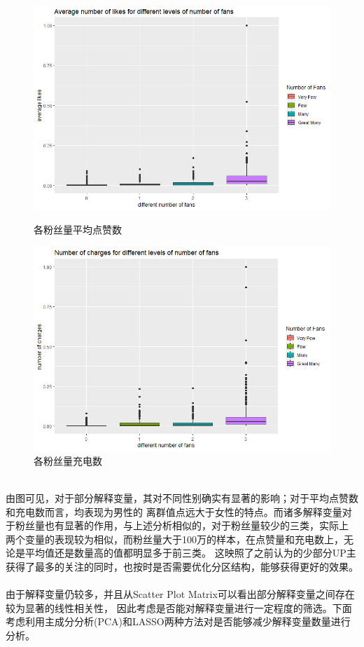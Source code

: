 \documentclass{ctexart}
\begin{document}
\begin{figure}[htbp]
    \centering
    \begin{minipage}[t]{0.48\textwidth}
        \centering
        \includegraphics[width=\textwidth]{EDA/av_like_fans_boxplot.png}
        \caption{各粉丝量平均点赞数}
    \end{minipage}
    \begin{minipage}[t]{0.48\textwidth}
        \centering
        \includegraphics[width=\textwidth]{EDA/num_charge_fan_boxplot.png}
        \caption{各粉丝量充电数}
    \end{minipage}
\end{figure}\\
\indent 由图可见，对于部分解释变量，其对不同性别确实有显著的影响；对于平均点赞数和充电数而言，均表现为男性的
离群值点远大于女性的特点。而诸多解释变量对于粉丝量也有显著的作用，与上述分析相似的，对于粉丝量较少的三类，实际上
两个变量的表现较为相似，而粉丝量大于100万的样本，在点赞量和充电数上，无论是平均值还是数量高的值都明显多于前三类。
这映照了之前认为的少部分UP主获得了最多的关注的同时，也按时是否需要优化分区结构，能够获得更好的效果。\\
\\
\indent 由于解释变量仍较多，并且从Scatter Plot Matrix可以看出部分解释变量之间存在较为显著的线性相关性，
因此考虑是否能对解释变量进行一定程度的筛选。下面考虑利用主成分分析(PCA)和LASSO两种方法对是否能够减少解释变量数量进行分析。
\end{document}
